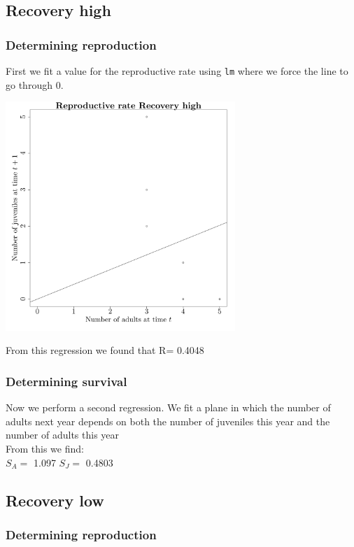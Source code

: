 \documentclass{article}\usepackage[]{graphicx}\usepackage[]{color}
\begin{document}
\subsection{ Recovery high }
\subsubsection{Determining reproduction}

First we fit a value for the reproductive rate using \texttt{lm} where we force the line to go through $0$. 



{\centering \includegraphics[width=0.65\textwidth]{figure/k510} 

}



 From this regression we found that R= 0.4048 

\subsubsection{Determining survival}

Now we perform a second regression. We fit a plane in which the number of adults next year depends on both the number of juveniles this year and the number of adults this year\\From this we find:\\ 
$S_A=$ 1.097 
$S_J=$ 0.4803 
\subsection{ Recovery low }
\subsubsection{Determining reproduction}
\end{document}
